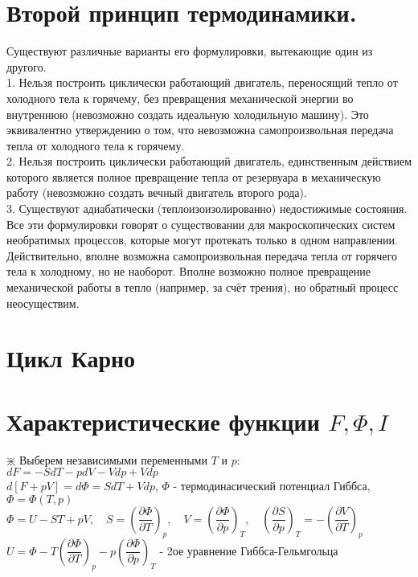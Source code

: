 \begin{multicols*}{2}
		\section{Второй принцип термодинамики.}
		Существуют различные варианты его формулировки, вытекающие один из другого.\\
		1. Нельзя построить циклически работающий двигатель, переносящий тепло от холодного тела к горячему, без превращения механической энергии во внутреннюю (невозможно создать идеальную холодильную машину). Это эквивалентно утверждению о том, что невозможна самопроизвольная передача тепла от холодного тела к горячему.\\
		2. Нельзя построить циклически работающий двигатель, единственным действием которого является полное превращение тепла от резервуара в механическую работу (невозможно создать вечный двигатель второго рода).\\
		3. Существуют адиабатически (теплоизоизолированно) недостижимые состояния.\\
		Все эти формулировки говорят о существовании для макроскопических систем необратимых процессов, которые могут протекать только в одном направлении. Действительно, вполне возможна самопроизвольная передача тепла от горячего тела к холодному, но не наоборот. Вполне возможно полное превращение механической работы в тепло (например, за счёт трения), но обратный процесс неосуществим.

		\section{Цикл Карно}

		\section{Характеристические функции $F, \Phi, I$}
		$\divideontimes$ Выберем независимыми переменными $T$ и $p$:\\
		$dF = -SdT - pdV - Vdp + Vdp$\\
		$d\left[F + pV\right] = d\Phi = S dT + V dp$, \quad $\Phi$ - термодинасический потенциал Гиббса, \quad $\Phi = \Phi(T, p)$\\
		$\Phi = U-ST+pV, \quad S = \left(\dfrac{\partial \Phi}{\partial T}\right)_p, \quad V = \left(\dfrac{\partial \Phi}{\partial p}\right)_T, \quad \left(\dfrac{\partial S}{\partial p}\right)_T = - \left(\dfrac{\partial V}{\partial T}\right)_p$\\
		$U = \Phi - T \left(\dfrac{\partial \Phi}{\partial T}\right)_p - p \left(\dfrac{\partial \Phi}{\partial p}\right)_T$ - 2ое уравнение Гиббса-Гельмгольца\\\\


\end{multicols*}
